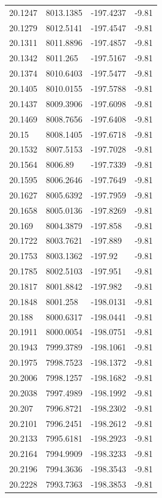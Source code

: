 \begin{table}[H]
\begin{tabular}{llll}
20.1247 & 8013.1385 & -197.4237 & -9.81 \\
20.1279 & 8012.5141 & -197.4547 & -9.81 \\
20.1311 & 8011.8896 & -197.4857 & -9.81 \\
20.1342 & 8011.265 & -197.5167 & -9.81 \\
20.1374 & 8010.6403 & -197.5477 & -9.81 \\
20.1405 & 8010.0155 & -197.5788 & -9.81 \\
20.1437 & 8009.3906 & -197.6098 & -9.81 \\
20.1469 & 8008.7656 & -197.6408 & -9.81 \\
20.15 & 8008.1405 & -197.6718 & -9.81 \\
20.1532 & 8007.5153 & -197.7028 & -9.81 \\
20.1564 & 8006.89 & -197.7339 & -9.81 \\
20.1595 & 8006.2646 & -197.7649 & -9.81 \\
20.1627 & 8005.6392 & -197.7959 & -9.81 \\
20.1658 & 8005.0136 & -197.8269 & -9.81 \\
20.169 & 8004.3879 & -197.858 & -9.81 \\
20.1722 & 8003.7621 & -197.889 & -9.81 \\
20.1753 & 8003.1362 & -197.92 & -9.81 \\
20.1785 & 8002.5103 & -197.951 & -9.81 \\
20.1817 & 8001.8842 & -197.982 & -9.81 \\
20.1848 & 8001.258 & -198.0131 & -9.81 \\
20.188 & 8000.6317 & -198.0441 & -9.81 \\
20.1911 & 8000.0054 & -198.0751 & -9.81 \\
20.1943 & 7999.3789 & -198.1061 & -9.81 \\
20.1975 & 7998.7523 & -198.1372 & -9.81 \\
20.2006 & 7998.1257 & -198.1682 & -9.81 \\
20.2038 & 7997.4989 & -198.1992 & -9.81 \\
20.207 & 7996.8721 & -198.2302 & -9.81 \\
20.2101 & 7996.2451 & -198.2612 & -9.81 \\
20.2133 & 7995.6181 & -198.2923 & -9.81 \\
20.2164 & 7994.9909 & -198.3233 & -9.81 \\
20.2196 & 7994.3636 & -198.3543 & -9.81 \\
20.2228 & 7993.7363 & -198.3853 & -9.81 \\

\end{tabular}
\end{table}
